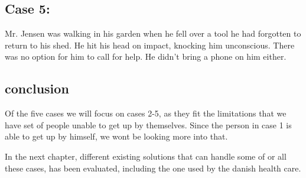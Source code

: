 \subsection{Case 5:}
Mr. Jensen was walking in his garden when he fell over a tool he had forgotten to return to his shed. He hit his head on impact, knocking him unconscious. There was no option for him to call for help. He didn't bring a phone on him either.

\subsection{conclusion}
Of the five cases we will focus on cases 2-5, as they fit the limitations that we have set of people unable to get up by themselves. Since the person in case 1 is able to get up by himself, we wont be looking more into that. 

In the next chapter, different existing solutions that can handle some of or all these cases, has been evaluated, including the one used by the danish health care.